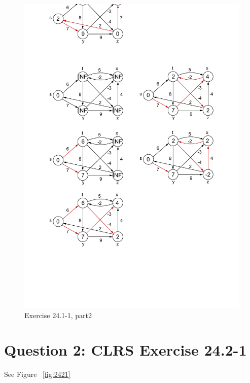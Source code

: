 \documentclass[]{article}
\begin{document}
\begin{figure}
	\centering
	\includegraphics[width=\linewidth]{2411-2}
	\caption{Exercise 24.1-1, part2}
	\label{fig:2411-2}
\end{figure}


\section{Question 2: CLRS Exercise 24.2-1}

See Figure ~\ref{fig:2421}
\end{document}
